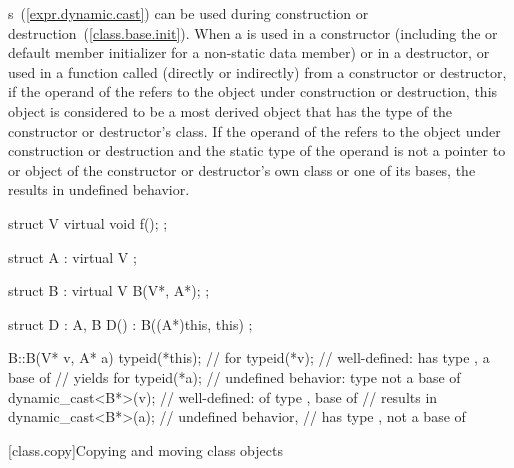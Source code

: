 \pnum
{}%
%
%
%
s~(\ref{expr.dynamic.cast}) can be used during construction
or destruction~(\ref{class.base.init}). When a
is used in a constructor (including the
 or default member initializer
for a non-static data member)
or in a destructor, or used in a function called (directly or indirectly) from
a constructor or destructor, if the operand of the
refers to the object under construction or destruction, this object is
considered to be a most derived object that has the type of the constructor or
destructor's class.
If the operand of the
refers to the object under construction or destruction and the static type of
the operand is not a pointer to or object of the constructor or destructor's
own class or one of its bases, the
results in undefined behavior.

\begin{example}

\begin{codeblock}
struct V {
  virtual void f();
};

struct A : virtual V { };

struct B : virtual V {
  B(V*, A*);
};

struct D : A, B {
  D() : B((A*)this, this) { }
};

B::B(V* v, A* a) {
  typeid(*this);                //  for 
  typeid(*v);                   // well-defined:  has type , a base of 
                                // yields  for 
  typeid(*a);                   // undefined behavior: type  not a base of 
  dynamic_cast<B*>(v);          // well-defined:  of type ,  base of 
                                // results in 
  dynamic_cast<B*>(a);          // undefined behavior,
                                //  has type ,  not a base of 
}
\end{codeblock}
\end{example}%
%

[class.copy]{Copying and moving class objects}%
%
%
%
%
%

